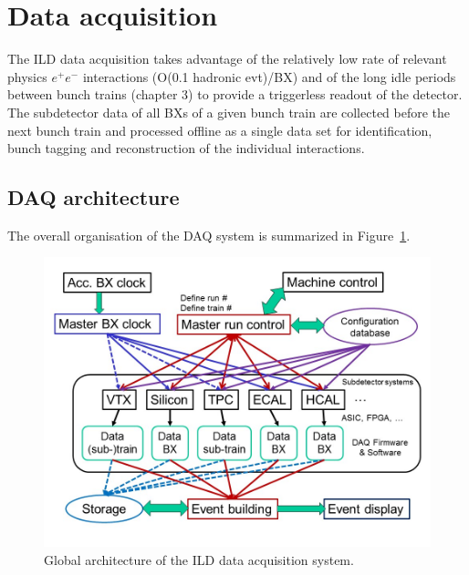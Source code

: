\section{Data acquisition}

The ILD data acquisition takes advantage of the relatively low rate of relevant physics $e^+e^-$ interactions (O(0.1 hadronic evt)/BX) and of the long idle periods between bunch trains (chapter 3) to provide a triggerless readout of the detector. The subdetector data of all BXs of a given bunch train are collected before the next bunch train and processed offline as a single data set for identification, bunch tagging and reconstruction of the individual interactions. 


\subsection{DAQ architecture}

The overall organisation of the DAQ system is summarized in Figure~\ref{fig:integration:DAQ_architecture}. 

\begin{figure}[t!]
\includegraphics[width=1.0\hsize]{Integration/fig/DAQ_architecture.jpg}
\caption{\label{fig:integration:DAQ_architecture}Global architecture of the ILD data acquisition system.}
\end{figure}

